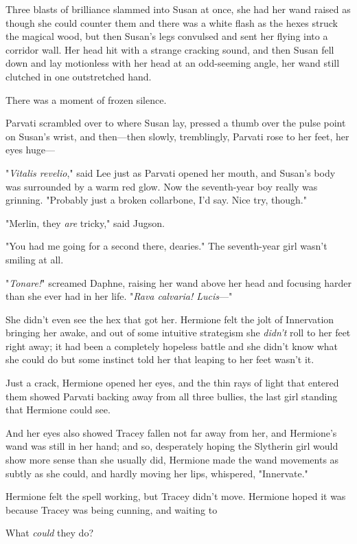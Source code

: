 Three blasts of brilliance slammed into Susan at once, she had her wand raised
as though she could counter them and there was a white flash as the hexes
struck the magical wood, but then Susan's legs convulsed and sent her flying
into a corridor wall. Her head hit with a strange cracking sound, and then
Susan fell down and lay motionless with her head at an odd-seeming angle, her
wand still clutched in one outstretched hand.

There was a moment of frozen silence.

Parvati scrambled over to where Susan lay, pressed a thumb over the pulse point
on Susan's wrist, and then—then slowly, tremblingly, Parvati rose to her
feet, her eyes huge—

"\emph{Vitalis revelio}," said Lee just as Parvati opened her mouth, and
Susan's body was surrounded by a warm red glow. Now the seventh-year boy really
was grinning. "Probably just a broken collarbone, I'd say. Nice try, though."

"Merlin, they \emph{are} tricky," said Jugson.

"You had me going for a second there, dearies." The seventh-year girl wasn't
smiling at all.

"\emph{Tonare!}" screamed Daphne, raising her wand above her head and focusing
harder than she ever had in her life. "\emph{Rava calvaria! Lucis}—"

She didn't even see the hex that got her.
\sbreak
Hermione felt the jolt of Innervation bringing her awake, and out of some
intuitive strategism she \emph{didn't} roll to her feet right away; it had been
a completely hopeless battle and she didn't know what she could do but some
instinct told her that leaping to her feet wasn't it.

Just a crack, Hermione opened her eyes, and the thin rays of light that entered
them showed Parvati backing away from all three bullies, the last girl standing
that Hermione could see.

And her eyes also showed Tracey fallen not far away from her, and Hermione's
wand was still in her hand; and so, desperately hoping the Slytherin girl would
show more sense than she usually did, Hermione made the wand movements as
subtly as she could, and hardly moving her lips, whispered, "Innervate."

Hermione felt the spell working, but Tracey didn't move. Hermione hoped it was
because Tracey was being cunning, and waiting to{\el}

What \emph{could} they do?


